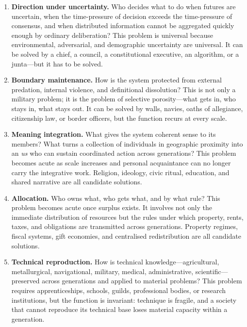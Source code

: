 \documentclass[12pt,a4paper]{article}
\begin{document}
\begin{enumerate}[leftmargin=1.8em, label=\textbf{\arabic*.}]

\item \textbf{Direction under uncertainty.} Who decides what to do when futures are uncertain, when the time-pressure of decision exceeds the time-pressure of consensus, and when distributed information cannot be aggregated quickly enough by ordinary deliberation? This problem is universal because environmental, adversarial, and demographic uncertainty are universal. It can be solved by a chief, a council, a constitutional executive, an algorithm, or a junta---but it has to be solved.

\item \textbf{Boundary maintenance.} How is the system protected from external predation, internal violence, and definitional dissolution? This is not only a military problem; it is the problem of selective porosity---what gets in, who stays in, what stays out. It can be solved by walls, navies, oaths of allegiance, citizenship law, or border officers, but the function recurs at every scale.

\item \textbf{Meaning integration.} What gives the system coherent sense to its members? What turns a collection of individuals in geographic proximity into an \textit{us} who can sustain coordinated action across generations? This problem becomes acute as scale increases and personal acquaintance can no longer carry the integrative work. Religion, ideology, civic ritual, education, and shared narrative are all candidate solutions.

\item \textbf{Allocation.} Who owns what, who gets what, and by what rule? This problem becomes acute once surplus exists. It involves not only the immediate distribution of resources but the rules under which property, rents, taxes, and obligations are transmitted across generations. Property regimes, fiscal systems, gift economies, and centralised redistribution are all candidate solutions.

\item \textbf{Technical reproduction.} How is technical knowledge---agricultural, metallurgical, navigational, military, medical, administrative, scientific---preserved across generations and applied to material problems? This problem requires apprenticeships, schools, guilds, professional bodies, or research institutions, but the function is invariant: technique is fragile, and a society that cannot reproduce its technical base loses material capacity within a generation.


\end{enumerate}
\end{document}
